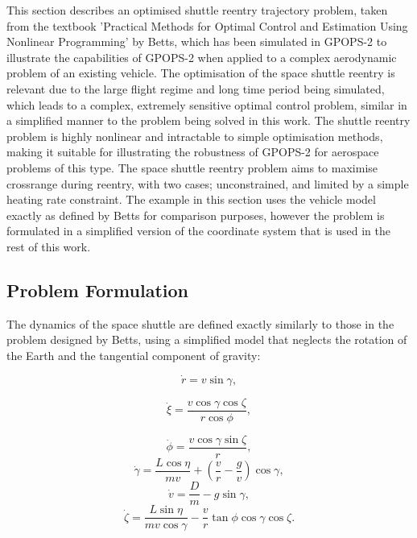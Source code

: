 This section describes an optimised shuttle reentry trajectory problem, taken from the textbook 'Practical Methods for Optimal Control and Estimation Using Nonlinear Programming' by Betts\cite{Betts2009}, which has been simulated in GPOPS-2 to illustrate the capabilities of GPOPS-2 when applied to a complex aerodynamic problem of an existing vehicle. The optimisation of the space shuttle reentry is relevant due to the large flight regime and long time period being simulated, which leads to a complex, extremely sensitive optimal control problem\cite{Betts2009}, similar in a simplified manner to the problem being solved in this work. The shuttle reentry problem is highly nonlinear and intractable to simple optimisation methods\cite{Betts2009}, making it suitable for illustrating the robustness of GPOPS-2 for aerospace problems of this type. 
The space shuttle reentry problem aims to maximise crossrange during reentry, with two cases; unconstrained, and limited by a simple heating rate constraint. The example in this section uses the vehicle model exactly as defined by Betts\cite{Betts2009} for comparison purposes, however the problem is formulated in a simplified version of the coordinate system that is used in the rest of this work. 


\subsection{Problem Formulation}

The dynamics of the space shuttle are defined exactly similarly to those in the problem designed by Betts\cite{Betts2009}, using a simplified model that neglects the rotation of the Earth and the tangential component of gravity:

\begin{equation}
\dot{r} = v \sin \gamma,
\end{equation}

\begin{equation}
\dot{\xi} = \frac{v\cos \gamma \cos \zeta}{r \cos \phi},
\end{equation}

\begin{equation}
\dot{\phi} = \frac{v\cos\gamma\sin\zeta}{r},
\end{equation}
\begin{equation}
\dot{\gamma} = \frac{L \cos\eta}{mv} + (\frac{v}{r}-\frac{g}{v})\cos\gamma,
\end{equation}
\begin{equation}
\dot{v} = \frac{D}{m}-g\sin\gamma,
\end{equation}
\begin{equation}
\dot{\zeta} = \frac{L  \sin\eta}{mv \cos \gamma}-\frac{v}{r}\tan\phi\cos\gamma\cos\zeta.
\end{equation}

